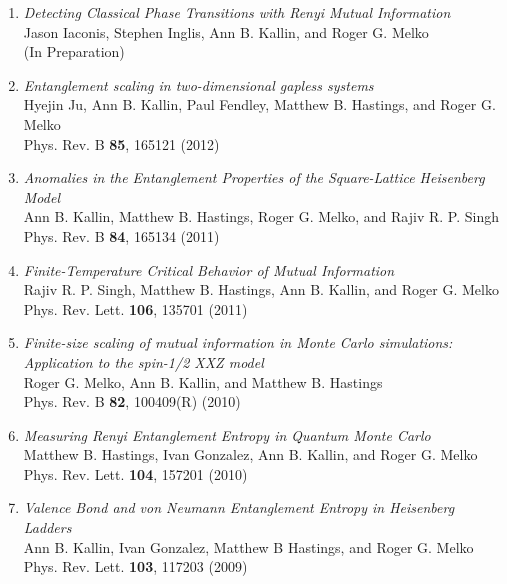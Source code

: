 \documentclass[letterpaper]{article}
\begin{document}
\begin{enumerate}

\item {\it Detecting Classical Phase Transitions with Renyi Mutual Information}\\
Jason Iaconis, Stephen Inglis, Ann B. Kallin, and Roger G. Melko \\
(In Preparation)

\item {\it Entanglement scaling in two-dimensional gapless systems} \\
Hyejin Ju, Ann B. Kallin, Paul Fendley, Matthew B. Hastings, and Roger G. Melko \\
Phys. Rev. B {\bf 85}, 165121 (2012)

\item  {\it Anomalies in the Entanglement Properties of the Square-Lattice Heisenberg Model} \\ %
Ann B. Kallin, Matthew B. Hastings, Roger G. Melko, and Rajiv R. P. Singh \\
Phys. Rev. B {\bf 84}, 165134 (2011) 

\item  {\it Finite-Temperature Critical Behavior of Mutual Information}\\%
Rajiv R. P. Singh, Matthew B. Hastings, Ann B. Kallin, and Roger G. Melko\\ 
Phys. Rev. Lett. {\bf 106}, 135701 (2011)

\item  {\it Finite-size scaling of mutual information in Monte Carlo simulations: Application to the spin-1/2 XXZ model}\\%
Roger G. Melko, Ann B. Kallin, and Matthew B. Hastings  \\
Phys. Rev. B {\bf 82}, 100409(R) (2010) 

\item  {\it Measuring Renyi Entanglement Entropy in Quantum Monte Carlo}\\%
Matthew B. Hastings, Ivan Gonzalez, Ann B. Kallin, and Roger G. Melko \\
Phys. Rev. Lett. {\bf 104}, 157201 (2010) 


\item  {\it Valence Bond and von Neumann Entanglement Entropy in Heisenberg Ladders} \\%
Ann B. Kallin, Ivan Gonzalez, Matthew B Hastings, and Roger G. Melko\\
Phys. Rev. Lett. {\bf 103}, 117203 (2009)


\end{enumerate}
\end{document}
